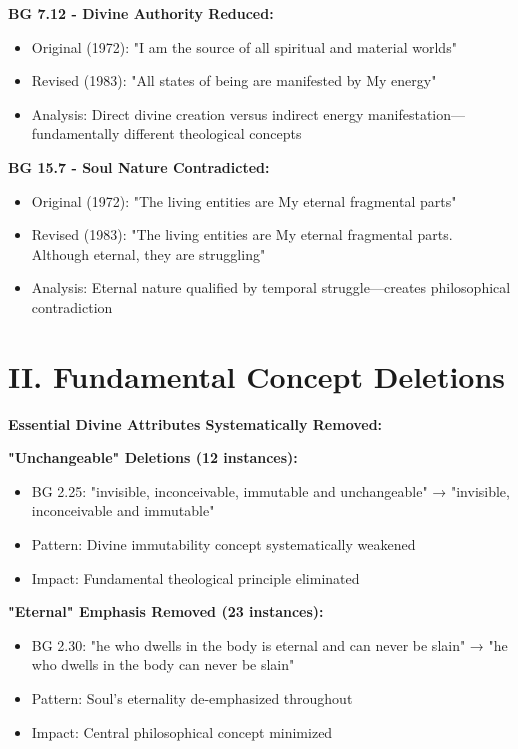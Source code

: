 \documentclass[11pt,twoside]{book}
\begin{document}
\textbf{\textbf{BG 7.12 - Divine Authority Reduced:}}
\begin{itemize}
\item Original (1972): "I am the source of all spiritual and material worlds"
\item Revised (1983): "All states of being are manifested by My energy"
\item Analysis: Direct divine creation versus indirect energy 
manifestation—fundamentally different theological concepts
\end{itemize}

\textbf{\textbf{BG 15.7 - Soul Nature Contradicted:}}
\begin{itemize}
\item Original (1972): "The living entities are My eternal fragmental parts"
\item Revised (1983): "The living entities are My eternal fragmental parts. Although eternal, they are struggling"
\item Analysis: Eternal nature qualified by temporal struggle—creates philosophical 
contradiction
\end{itemize}
\section*{II. Fundamental Concept Deletions}
\label{sec:orgdce9b4a}

\textbf{\textbf{Essential Divine Attributes Systematically Removed:}}

\textbf{\textbf{"Unchangeable" Deletions (12 instances):}}
\begin{itemize}
\item BG 2.25: "invisible, inconceivable, immutable and unchangeable" → "invisible, inconceivable and immutable"
\item Pattern: Divine immutability concept systematically weakened
\item Impact: Fundamental theological principle eliminated
\end{itemize}

\textbf{\textbf{"Eternal" Emphasis Removed (23 instances):}}  
\begin{itemize}
\item BG 2.30: "he who dwells in the body is eternal and can never be slain" → "he who dwells in the body can never be slain"
\item Pattern: Soul's eternality de-emphasized throughout
\item Impact: Central philosophical concept minimized
\end{itemize}
\end{document}
